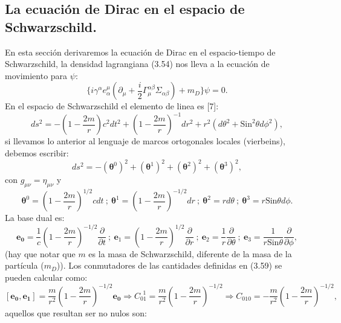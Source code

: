 \subsection{La ecuación de Dirac en el espacio de Schwarzschild.}
En esta sección derivaremos la ecuación de Dirac en el espacio-tiempo de Schwarzschild, la densidad lagrangiana (3.54) nos lleva a la ecuación de movimiento para $\psi$:
\begin{equation}
\{i\gamma^{\alpha}e_{\alpha}^{\mu}(\partial_{\mu}+\frac{i}{2}\Gamma_{\mu}^{\alpha\beta}\Sigma_{\alpha\beta})+m_{D}\}\psi=0 .
\end{equation}
En el espacio de Schwarzschild el elemento de linea es [7]:
\begin{equation}
ds^{2}=-\left(1-\frac{2m}{r}\right)c^{2}dt^{2}+\left(1-\frac{2m}{r}\right)^{-1}dr^{2}+r^{2}(d\theta^{2}+\text{Sin}^{2}\theta d\phi^{2}),
\end{equation}
si llevamos lo anterior al lenguaje de marcos ortogonales locales (vierbeins), debemos escribir:
\begin{equation}
ds^{2}=-(\mathbf{\theta}^{0})^{2}+(\mathbf{\theta}^{1})^{2}+(\mathbf{\theta}^{2})^{2}+(\mathbf{\theta}^{3})^{2} ,
\end{equation}
con $g_{\mu\nu}=\eta_{\mu\nu}$ y
\begin{equation}
\mathbf{\theta}^{0}=\left(1-\frac{2m}{r}\right)^{1/2}cdt\ ;\ \mathbf{\theta}^{1}=\left(1-\frac{2m}{r}\right)^{-1/2}dr\ ;\ \mathbf{\theta}^{2}=rd\theta\ ;\ \mathbf{\theta}^{3}=r\text{Sin}\theta d\phi .
\end{equation}
La base dual es:
\begin{equation}
\mathbf{e_{0}}=\frac{1}{c}\left(1-\frac{2m}{r}\right)^{-1/2}\frac{\partial}{\partial t}\ ;\ \mathbf{e}_{1}=\left(1-\frac{2m}{r}\right)^{1/2}\frac{\partial}{\partial r}\ ;\ \mathbf{e}_{2}=\frac{1}{r}\frac{\partial}{\partial\theta}\ ;\ \mathbf{e}_{3}=\frac{1}{r\text{Sin}\theta}\frac{\partial}{\partial\phi} ,
\end{equation}
(hay que notar que $m$ es la masa de Schwarzschild, diferente de la masa de la partícula ($m_D$)). Los conmutadores de las cantidades definidas en (3.59) se pueden calcular como:
\begin{equation}
\nonumber [\mathbf{e_{0}},\mathbf{e_{1}}]=\frac{m}{r^{2}}\left(1-\frac{2m}{r}\right)^{-1/2}\mathbf{e_{0}}\Rightarrow C_{01}^{\ \ 1}=\frac{m}{r^{2}}\left(1-\frac{2m}{r}\right)^{-1/2}\Rightarrow C_{010}=-\frac{m}{r^{2}}\left(1-\frac{2m}{r}\right)^{-1/2} ,
\end{equation}
aquellos que resultan ser no nulos son:

